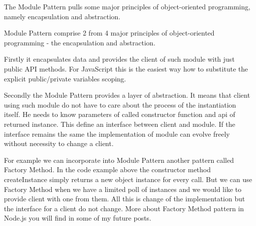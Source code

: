 The Module Pattern pulls some major principles  of object-oriented programming, namely encapsulation and abstraction.

Module Pattern comprise 2 from 4 major principles of object-oriented programming - the encapsulation and abstraction.

Firstly it encapsulates data and provides the client of such module with just public API methods. For JavaScript this is the easiest way how to substitute the explicit public/private variables scoping.

Secondly the Module Pattern provides a layer of abstraction. It means that client using such module do not have to care about the process of the instantiation itself. He needs to know parameters of called constructor function and api of returned instance. This define an interface between client and module. If the interface remains the same the implementation of module can evolve freely without necessity to change a client.

For example we can incorporate into Module Pattern another pattern called Factory Method. In the code example above the constructor method createInstance simply returns a new object instance for every call. But we can use Factory Method when we have a limited poll of instances and we would like to provide client with one from them. All this is change of the implementation but the interface for a client do not change. More about Factory Method pattern in Node.js you will find in some of my future posts.